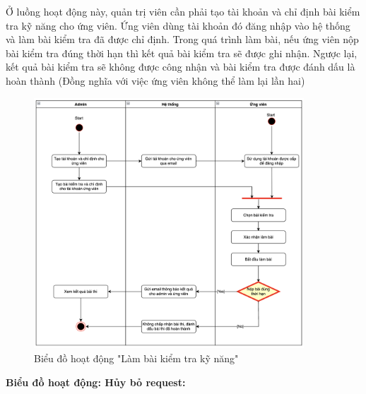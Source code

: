 \documentclass[../DoAn.tex]{subfiles}
\begin{document}
Ở luồng hoạt động này, quản trị viên cần phải tạo tài khoản và chỉ định bài kiểm tra kỹ năng cho ứng viên. Ứng viên dùng tài khoản đó đăng nhập vào hệ thống và làm bài kiểm tra đã được chỉ định. Trong quá trình làm bài, nếu ứng viên nộp bài kiểm tra đúng thời hạn thì kết quả bài kiểm tra sẽ được ghi nhận. Ngược lại, kết quả bài kiểm tra sẽ không được công nhận và bài kiểm tra được đánh dấu là hoàn thành (Đồng nghĩa với việc ứng viên không thể làm lại lần hai)
\begin{figure}[H]
    \centering
    \includegraphics[width=0.9\textwidth]{Hinhve/AD_LamBaiKiemTraKyNang.png}
    \caption{Biểu đồ hoạt động "Làm bài kiểm tra kỹ năng"}
\end{figure}

\textbf{Biểu đồ hoạt động: Hủy bỏ request:}
\end{document}
